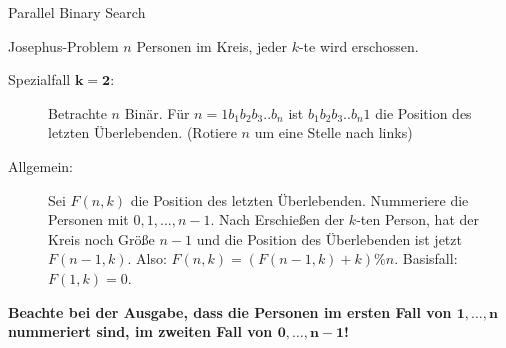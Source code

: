\begin{algorithm}{Parallel Binary Search}
\end{algorithm}

\begin{algorithm}{Josephus-Problem}
	$n$ Personen im Kreis, jeder $k$-te wird erschossen.
	\begin{description}
		\item[Spezialfall $\boldsymbol{k=2}$:] Betrachte $n$ Binär.
		Für $n = 1b_1b_2b_3..b_n$ ist $b_1b_2b_3..b_n1$ die Position des letzten Überlebenden.
		(Rotiere $n$ um eine Stelle nach links)
	\end{description}
		
	\begin{description}
		\item[Allgemein:] Sei $F(n,k)$ die Position des letzten Überlebenden.
		Nummeriere die Personen mit $0, 1, \ldots, n-1$.
		Nach Erschießen der $k$-ten Person, hat der Kreis noch Größe $n-1$ und die Position des Überlebenden ist jetzt $F(n-1,k)$.
		Also: $F(n,k) = (F(n-1,k)+k)\%n$. Basisfall: $F(1,k) = 0$. 
	\end{description}
	
	\textbf{Beachte bei der Ausgabe, dass die Personen im ersten Fall von $\boldsymbol{1, \ldots, n}$ nummeriert sind, im zweiten Fall von $\boldsymbol{0, \ldots, n-1}$!}
\end{algorithm}

